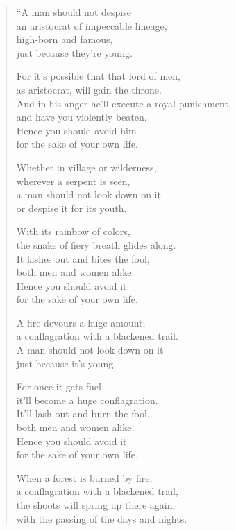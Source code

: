 \documentclass[12pt,openany]{book}%
\begin{document}
\begin{verse}%
“A man should not despise \\
an aristocrat of impeccable lineage, \\
high-born and famous, \\
just because they’re young. 

For it’s possible that that lord of men, \\
as aristocrat, will gain the throne. \\
And in his anger he’ll execute a royal punishment, \\
and have you violently beaten. \\
Hence you should avoid him \\
for the sake of your own life. 

Whether in village or wilderness, \\
wherever a serpent is seen, \\
a man should not look down on it \\
or despise it for its youth. 

With its rainbow of colors, \\
the snake of fiery breath glides along. \\
It lashes out and bites the fool, \\
both men and women alike. \\
Hence you should avoid it \\
for the sake of your own life. 

A fire devours a huge amount, \\
a conflagration with a blackened trail. \\
A man should not look down on it \\
just because it’s young. 

For once it gets fuel \\
it’ll become a huge conflagration. \\
It’ll lash out and burn the fool, \\
both men and women alike. \\
Hence you should avoid it \\
for the sake of your own life. 

When a forest is burned by fire, \\
a conflagration with a blackened trail, \\
the shoots will spring up there again, \\
with the passing of the days and nights. 


\end{verse}
\end{document}
